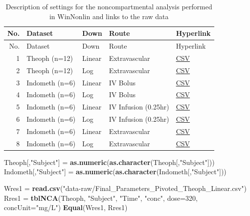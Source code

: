 \documentclass[12pt,]{krantz}
\newenvironment{Shaded}{\begin{snugshade}}{\end{snugshade}}
\newcommand{\DataTypeTok}[1]{\textcolor[rgb]{0.13,0.29,0.53}{#1}}
\newcommand{\DecValTok}[1]{\textcolor[rgb]{0.00,0.00,0.81}{#1}}
\newcommand{\KeywordTok}[1]{\textcolor[rgb]{0.13,0.29,0.53}{\textbf{#1}}}
\newcommand{\NormalTok}[1]{#1}
\newcommand{\StringTok}[1]{\textcolor[rgb]{0.31,0.60,0.02}{#1}}
\begin{document}
\begin{longtable}[]{@{}rllll@{}}
\caption{\label{tab:unnamed-chunk-3}Description of settings for the noncompartmental analysis performed in WinNonlin and links to the raw data}\tabularnewline
\toprule
No. & Dataset & Down & Route & Hyperlink\tabularnewline
\midrule
\endfirsthead
\toprule
No. & Dataset & Down & Route & Hyperlink\tabularnewline
\midrule
\endhead
1 & Theoph (n=12) & Linear & Extravascular & \href{https://raw.githubusercontent.com/asancpt/NonCompart-tests/master/Final_Parameters_Pivoted_Theoph_Linear.csv}{CSV}\tabularnewline
2 & Theoph (n=12) & Log & Extravascular & \href{https://raw.githubusercontent.com/asancpt/NonCompart-tests/master/Final_Parameters_Pivoted_Theoph_Log.csv}{CSV}\tabularnewline
3 & Indometh (n=6) & Linear & IV Bolus & \href{https://raw.githubusercontent.com/asancpt/NonCompart-tests/master/Final_Parameters_Pivoted_Indometh_Linear.csv}{CSV}\tabularnewline
4 & Indometh (n=6) & Log & IV Bolus & \href{https://raw.githubusercontent.com/asancpt/NonCompart-tests/master/Final_Parameters_Pivoted_Indometh_Log.csv}{CSV}\tabularnewline
5 & Indometh (n=6) & Linear & IV Infusion (0.25hr) & \href{https://raw.githubusercontent.com/asancpt/NonCompart-tests/master/Final_Parameters_Pivoted_Indometh_Linear_Infusion.csv}{CSV}\tabularnewline
6 & Indometh (n=6) & Log & IV Infusion (0.25hr) & \href{https://raw.githubusercontent.com/asancpt/NonCompart-tests/master/Final_Parameters_Pivoted_Indometh_Log_Infusion.csv}{CSV}\tabularnewline
7 & Indometh (n=6) & Linear & Extravascular & \href{https://raw.githubusercontent.com/asancpt/NonCompart-tests/master/Final_Parameters_Pivoted_Indometh_Linear_Wrong_Extravascular.csv}{CSV}\tabularnewline
8 & Indometh (n=6) & Log & Extravascular & \href{https://raw.githubusercontent.com/asancpt/NonCompart-tests/master/Final_Parameters_Pivoted_Indometh_Log_Wrong_Extravascular.csv}{CSV}\tabularnewline
\bottomrule
\end{longtable}

\begin{Shaded}
\begin{Highlighting}[]
\NormalTok{Theoph[,}\StringTok{"Subject"}\NormalTok{] =}\StringTok{ }\KeywordTok{as.numeric}\NormalTok{(}\KeywordTok{as.character}\NormalTok{(Theoph[,}\StringTok{"Subject"}\NormalTok{]))}
\NormalTok{Indometh[,}\StringTok{"Subject"}\NormalTok{] =}\StringTok{ }\KeywordTok{as.numeric}\NormalTok{(}\KeywordTok{as.character}\NormalTok{(Indometh[,}\StringTok{"Subject"}\NormalTok{]))}

\NormalTok{Wres1 =}\StringTok{ }\KeywordTok{read.csv}\NormalTok{(}\StringTok{"data-raw/Final_Parameters_Pivoted_Theoph_Linear.csv"}\NormalTok{)}
\NormalTok{Rres1 =}\StringTok{ }\KeywordTok{tblNCA}\NormalTok{(Theoph, }\StringTok{"Subject"}\NormalTok{, }\StringTok{"Time"}\NormalTok{, }\StringTok{"conc"}\NormalTok{, }\DataTypeTok{dose=}\DecValTok{320}\NormalTok{, }\DataTypeTok{concUnit=}\StringTok{"mg/L"}\NormalTok{)}
\KeywordTok{Equal}\NormalTok{(Wres1, Rres1)}
\end{Highlighting}
\end{Shaded}
\end{document}
